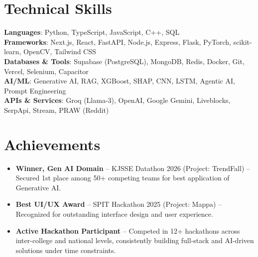 \documentclass[letterpaper,11pt]{article}
\newcommand{\resumeItem}[1]{
  \item\small{{#1}}
}
\newcommand{\resumeItemListStart}{\begin{itemize}[leftmargin=0.4in, label=\tiny$\bullet$]}
\newcommand{\resumeItemListEnd}{\end{itemize}}
\begin{document}
\section{Technical Skills}
 \begin{itemize}[leftmargin=0.15in, label={}]
    \small{\item{
      \textbf{Languages}{: Python, TypeScript, JavaScript, C++, SQL} \\
      \textbf{Frameworks}{: Next.js, React, FastAPI, Node.js, Express, Flask, PyTorch, scikit-learn, OpenCV, Tailwind CSS} \\
      \textbf{Databases \& Tools}{: Supabase (PostgreSQL), MongoDB, Redis, Docker, Git, Vercel, Selenium, Capacitor} \\
      \textbf{AI/ML}{: Generative AI, RAG, XGBoost, SHAP, CNN, LSTM, Agentic AI, Prompt Engineering} \\
      \textbf{APIs \& Services}{: Groq (Llama-3), OpenAI, Google Gemini, Liveblocks, SerpApi, Stream, PRAW (Reddit)} \\
    }}
 \end{itemize}

\section{Achievements}
    \resumeItemListStart
      \resumeItem{\textbf{Winner, Gen AI Domain} -- KJSSE Datathon 2026 (Project: TrendFall) -- Secured 1st place among 50+ competing teams for best application of Generative AI.}
      \resumeItem{\textbf{Best UI/UX Award} -- SPIT Hackathon 2025 (Project: Mappa) -- Recognized for outstanding interface design and user experience.}
      \resumeItem{\textbf{Active Hackathon Participant} -- Competed in 12+ hackathons across inter-college and national levels, consistently building full-stack and AI-driven solutions under time constraints.}
    \resumeItemListEnd

\end{document}
